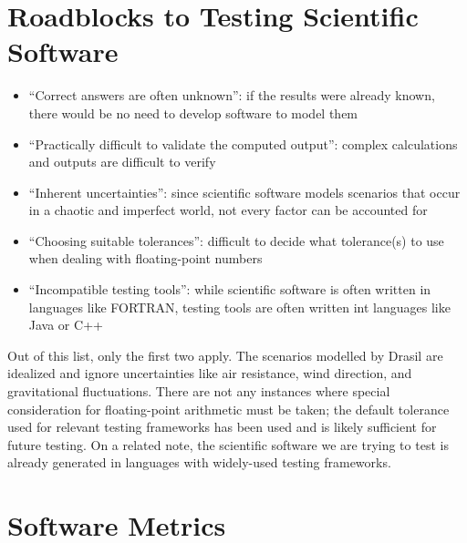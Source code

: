 \section{Roadblocks to Testing Scientific Software
  \cite[p.~67]{kanewala_metamorphic_2019}}
\begin{itemize}
      \item ``Correct answers are often unknown'': if the results were already
            known, there would be no need to develop software to model them
            \cite[p.~67]{kanewala_metamorphic_2019}
      \item ``Practically difficult to validate the computed output'': complex
            calculations and outputs are difficult to verify
            \cite[p.~67]{kanewala_metamorphic_2019}
      \item ``Inherent uncertainties'': since scientific software models
            scenarios that occur in a chaotic and imperfect world, not every
            factor can be accounted for \cite[p.~67]{kanewala_metamorphic_2019}
      \item ``Choosing suitable tolerances'': difficult to decide what
            tolerance(s) to use when dealing with floating-point numbers
            \cite[p.~67]{kanewala_metamorphic_2019}
      \item ``Incompatible testing tools'': while scientific software is often
            written in languages like FORTRAN, testing tools are often written
            int languages like Java or C++ \cite[p.~67]{kanewala_metamorphic_2019}
\end{itemize}

Out of this list, only the first two apply. The scenarios modelled by Drasil
are idealized and ignore uncertainties like air resistance, wind direction,
and gravitational fluctuations. There are not any instances where special
consideration for floating-point arithmetic must be taken; the default
tolerance used for relevant testing frameworks has been used
 and is likely sufficient for future testing. On a related
note, the scientific software we are trying to test is already generated in
languages with widely-used testing frameworks. 

\section{Software Metrics}
\label{chap:notes:sec:software-metrics}


